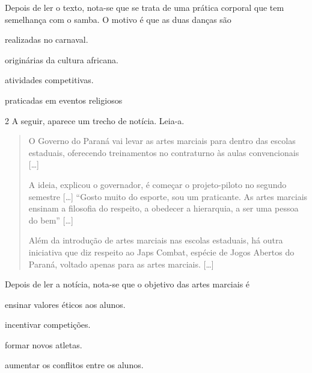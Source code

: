 \noindent{}Depois de ler o texto, nota-se que se trata de uma prática corporal que tem semelhança
com o samba. O motivo é que as duas danças são

\begin{escolha}
\item realizadas no carnaval.

\item originárias da cultura africana.

\item atividades competitivas.

\item praticadas em eventos religiosos
\end{escolha}



\num{2} A seguir, aparece um trecho de notícia. Leia-a.
\begin{quote}
  O Governo do Paraná vai levar as artes marciais para dentro das
  escolas estaduais, oferecendo treinamentos no contraturno às aulas
  convencionais {[}\ldots{}{]}

A ideia, explicou o governador, é começar o projeto-piloto no segundo semestre {[}\ldots{}{]} “Gosto muito do esporte, sou
um praticante. As artes marciais ensinam a filosofia do respeito, a
obedecer a hierarquia, a ser uma pessoa do bem” {[}\ldots{}{]}

Além da introdução de artes marciais nas escolas estaduais, há outra
iniciativa que diz respeito ao Japs Combat, espécie de Jogos Abertos do
Paraná, voltado apenas para as artes marciais. {[}\ldots{}{]}

\end{quote}

\noindent{}Depois de ler a notícia, nota-se que o objetivo das artes marciais é

\begin{escolha}
\item ensinar valores éticos aos alunos.

\item incentivar competições.

\item formar novos atletas.

\item aumentar os conflitos entre os alunos.
\end{escolha}

